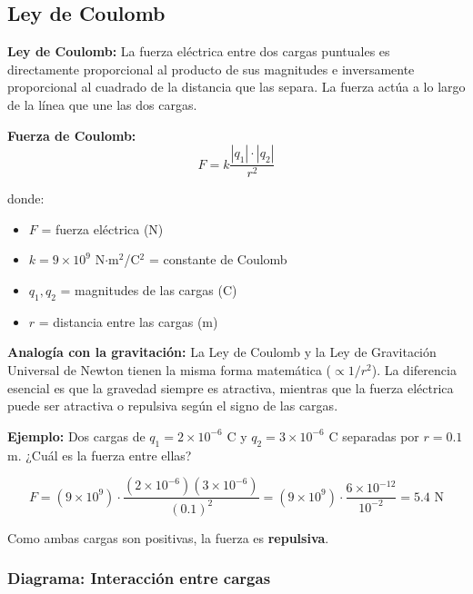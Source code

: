 \subsection{Ley de Coulomb}

\begin{seccion}
\begin{definicion}
\textbf{Ley de Coulomb:} La fuerza eléctrica entre dos cargas puntuales es directamente proporcional al producto de sus magnitudes e inversamente proporcional al cuadrado de la distancia que las separa. La fuerza actúa a lo largo de la línea que une las dos cargas.
\end{definicion}

\begin{ecuacion}
\textbf{Fuerza de Coulomb:}
$$F = k \frac{|q_1| \cdot |q_2|}{r^2}$$

donde:
\begin{itemize}
    \item $F$ = fuerza eléctrica (N)
    \item $k = 9 \times 10^9$ N$\cdot$m$^2$/C$^2$ = constante de Coulomb
    \item $q_1, q_2$ = magnitudes de las cargas (C)
    \item $r$ = distancia entre las cargas (m)
\end{itemize}
\end{ecuacion}

\begin{nota}
\textbf{Analogía con la gravitación:} La Ley de Coulomb y la Ley de Gravitación Universal de Newton tienen la misma forma matemática ($\propto 1/r^2$). La diferencia esencial es que la gravedad siempre es atractiva, mientras que la fuerza eléctrica puede ser atractiva o repulsiva según el signo de las cargas.
\end{nota}

\textbf{Ejemplo:} Dos cargas de $q_1 = 2 \times 10^{-6}$ C y $q_2 = 3 \times 10^{-6}$ C separadas por $r = 0.1$ m. ¿Cuál es la fuerza entre ellas?

$$F = (9 \times 10^9) \cdot \frac{(2 \times 10^{-6})(3 \times 10^{-6})}{(0.1)^2} = (9 \times 10^9) \cdot \frac{6 \times 10^{-12}}{10^{-2}} = 5.4 \text{ N}$$

Como ambas cargas son positivas, la fuerza es \textbf{repulsiva}.
\end{seccion}

\subsubsection{Diagrama: Interacción entre cargas}


